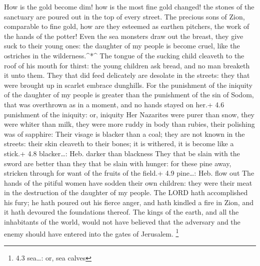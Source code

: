  How is the gold become dim! how is the most fine gold
changed! the stones of the sanctuary are poured out in the top of every
street.  The precious sons of Zion, comparable to fine gold,
how are they esteemed as earthen pitchers, the work of the hands of the
potter!  Even the sea monsters draw out the breast, they
give suck to their young ones: the daughter of my people is become
cruel, like the ostriches in the wilderness.\^{}*\^{}  The
tongue of the sucking child cleaveth to the roof of his mouth for
thirst: the young children ask bread, and no man breaketh it unto them.
 They that did feed delicately are desolate in the streets:
they that were brought up in scarlet embrace dunghills.  For
the punishment of the iniquity of the daughter of my people is greater
than the punishment of the sin of Sodom, that was overthrown as in a
moment, and no hands stayed on her.+ 4.6 punishment of the iniquity: or,
iniquity  Her Nazarites were purer than snow, they were
whiter than milk, they were more ruddy in body than rubies, their
polishing was of sapphire:  Their visage is blacker than a
coal; they are not known in the streets: their skin cleaveth to their
bones; it is withered, it is become like a stick.+ 4.8 blacker\ldots:
Heb. darker than blackness  They that be slain with the
sword are better than they that be slain with hunger: for these pine
away, stricken through for want of the fruits of the field.+ 4.9
pine\ldots: Heb. flow out  The hands of the pitiful women
have sodden their own children: they were their meat in the destruction
of the daughter of my people.  The LORD hath accomplished
his fury; he hath poured out his fierce anger, and hath kindled a fire
in Zion, and it hath devoured the foundations thereof.  The
kings of the earth, and all the inhabitants of the world, would not have
believed that the adversary and the enemy should have entered into the
gates of Jerusalem. \footnote{4.3 sea\ldots: or, sea calves}

